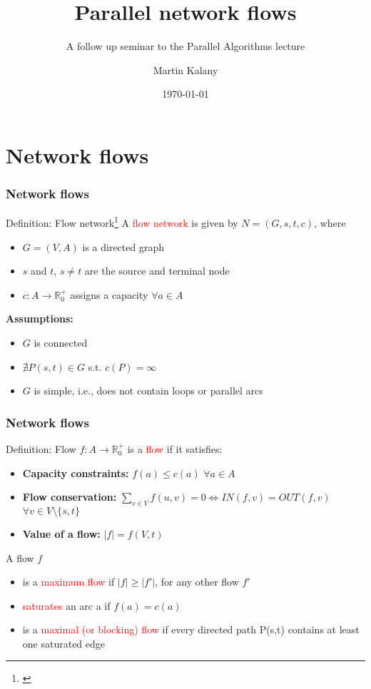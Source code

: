 \documentclass{beamer}
\title{Parallel network flows}
\subtitle{A follow up seminar to the Parallel Algorithms lecture}
\author{Martin Kalany\inst{1} }
\institute
{
  \inst{1}
  Graduate student in Computer Science\\
  Vienna University of Technology\\
}
\date{\today}
\begin{document}

\frame{\titlepage}
	
\section{Network flows}
\begin{frame}
	\frametitle{Network flows}
    \begin{block}{Definition: Flow network}\footnote{\cite{ahuja93}}
    A \textcolor{red}{flow network}  is given by $N = (G,s,t,c)$, where
    \begin{itemize}
    		\item $G =(V,A)$ is a directed graph
    		\item $s$ and $t$, $s \neq t$ are the source and terminal node
    		\item $c:A\rightarrow \mathbb{R}_0^{+}$ assigns a capacity $\forall a \in A$
    \end{itemize}
    \end{block}
    \textbf{Assumptions:}
	\begin{itemize}
		\item $G$ is connected
		\item $\nexists P(s,t) \in G$ s.t. $c(P) = \infty$
		\item $G$ is simple, i.e., does not contain loops or parallel arcs
	\end{itemize}
\end{frame}
  
\begin{frame}[shrink]
	\frametitle{Network flows}
	\begin{block}{Definition: Flow}
	$f:A \rightarrow \mathbb{R}_0^{+}$ is a \textcolor{red}{flow} if it satisfies:
	\begin{itemize}
		\item \textbf{Capacity constraints:} $f(a) \leq c(a)$ $\forall a \in A$
		\item \textbf{Flow conservation:} 
		$ \sum\limits_{v \in V} f(u,v) =  0 \Leftrightarrow IN(f,v) = OUT(f,v)$ $\forall v \in V \setminus \{s,t\}$
		\item \textbf{Value of a flow:} $\lvert f\rvert = f(V,t)$ 
	\end{itemize}
	\end{block}
	
	\begin{block}{A flow $f$}
	\begin{itemize}
		\item is a \textcolor{red}{maximum flow} if $\lvert f\rvert \geq \lvert f'\rvert$, for any other flow $f'$
		\item \textcolor{red}{saturates} an arc a if $f(a) = c(a)$
		\item is a \textcolor{red}{maximal (or blocking) flow} if every directed path P(s,t) contains at least one saturated edge
	\end{itemize}
	\end{block}
\end{frame}
\end{document}
